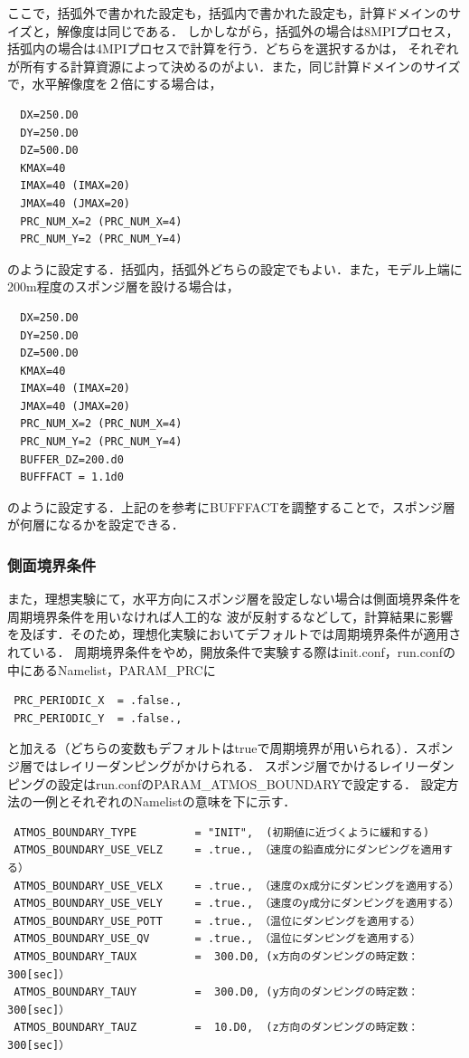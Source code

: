 ここで，括弧外で書かれた設定も，括弧内で書かれた設定も，計算ドメインのサイズと，解像度は同じである．
しかしながら，括弧外の場合は8MPIプロセス，括弧内の場合は4MPIプロセスで計算を行う．どちらを選択するかは，
それぞれが所有する計算資源によって決めるのがよい．また，同じ計算ドメインのサイズで，水平解像度を２倍にする場合は，

\begin{verbatim}
  DX=250.D0
  DY=250.D0
  DZ=500.D0
  KMAX=40
  IMAX=40 (IMAX=20)
  JMAX=40 (JMAX=20)
  PRC_NUM_X=2 (PRC_NUM_X=4)
  PRC_NUM_Y=2 (PRC_NUM_Y=4)
\end{verbatim}

のように設定する．括弧内，括弧外どちらの設定でもよい．また，モデル上端に200m程度のスポンジ層を設ける場合は，

\begin{verbatim}
  DX=250.D0
  DY=250.D0
  DZ=500.D0
  KMAX=40
  IMAX=40 (IMAX=20)
  JMAX=40 (JMAX=20)
  PRC_NUM_X=2 (PRC_NUM_X=4)
  PRC_NUM_Y=2 (PRC_NUM_Y=4)
  BUFFER_DZ=200.d0
  BUFFFACT = 1.1d0
\end{verbatim}

のように設定する．上記の\cite{eq3.1}を参考にBUFFFACTを調整することで，スポンジ層が何層になるかを設定できる．\\

\subsubsection{側面境界条件}
また，理想実験にて，水平方向にスポンジ層を設定しない場合は側面境界条件を周期境界条件を用いなければ人工的な
波が反射するなどして，計算結果に影響を及ぼす．そのため，理想化実験においてデフォルトでは周期境界条件が適用されている．
周期境界条件をやめ，開放条件で実験する際はinit.conf，run.confの中にあるNamelist，PARAM\_PRCに

\begin{verbatim}
 PRC_PERIODIC_X  = .false.,
 PRC_PERIODIC_Y  = .false.,
\end{verbatim}

と加える（どちらの変数もデフォルトはtrueで周期境界が用いられる）．スポンジ層ではレイリーダンピングがかけられる．
スポンジ層でかけるレイリーダンピングの設定はrun.confのPARAM\_ATMOS\_BOUNDARYで設定する．
設定方法の一例とそれぞれのNamelistの意味を下に示す．

\begin{verbatim}
 ATMOS_BOUNDARY_TYPE         = "INIT",  (初期値に近づくように緩和する)
 ATMOS_BOUNDARY_USE_VELZ     = .true., （速度の鉛直成分にダンピングを適用する）
 ATMOS_BOUNDARY_USE_VELX     = .true., （速度のx成分にダンピングを適用する）
 ATMOS_BOUNDARY_USE_VELY     = .true., （速度のy成分にダンピングを適用する）
 ATMOS_BOUNDARY_USE_POTT     = .true., （温位にダンピングを適用する）
 ATMOS_BOUNDARY_USE_QV       = .true., （温位にダンピングを適用する）
 ATMOS_BOUNDARY_TAUX         =  300.D0, (x方向のダンピングの時定数：300[sec]）
 ATMOS_BOUNDARY_TAUY         =  300.D0, (y方向のダンピングの時定数：300[sec]）
 ATMOS_BOUNDARY_TAUZ         =  10.D0,  (z方向のダンピングの時定数：300[sec]）
\end{verbatim}

